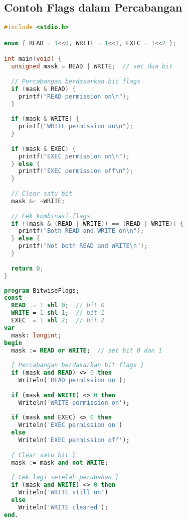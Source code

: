 \documentclass[../main.tex]{subfiles}
\begin{document}
\subsection{Contoh Flags dalam Percabangan}
\begin{lstlisting}[language=C, caption={Bit flags dengan kondisi di C}]
#include <stdio.h>

enum { READ = 1<<0, WRITE = 1<<1, EXEC = 1<<2 };

int main(void) {
  unsigned mask = READ | WRITE;  // set dua bit
  
  // Percabangan berdasarkan bit flags
  if (mask & READ) {
    printf("READ permission on\n");
  }
  
  if (mask & WRITE) {
    printf("WRITE permission on\n");
  }
  
  if (mask & EXEC) {
    printf("EXEC permission on\n");
  } else {
    printf("EXEC permission off\n");
  }
  
  // Clear satu bit
  mask &= ~WRITE;
  
  // Cek kombinasi flags
  if ((mask & (READ | WRITE)) == (READ | WRITE)) {
    printf("Both READ and WRITE on\n");
  } else {
    printf("Not both READ and WRITE\n");
  }
  
  return 0;
}
\end{lstlisting}

\begin{lstlisting}[language=Pascal, caption={Pergeseran dan bitwise dengan kondisi di Pascal}]
program BitwiseFlags;
const
  READ  = 1 shl 0;  // bit 0
  WRITE = 1 shl 1;  // bit 1
  EXEC  = 1 shl 2;  // bit 2
var
  mask: longint;
begin
  mask := READ or WRITE;  // set bit 0 dan 1
  
  { Percabangan berdasarkan bit flags }
  if (mask and READ) <> 0 then
    Writeln('READ permission on');
  
  if (mask and WRITE) <> 0 then
    Writeln('WRITE permission on');
  
  if (mask and EXEC) <> 0 then
    Writeln('EXEC permission on')
  else
    Writeln('EXEC permission off');
  
  { Clear satu bit }
  mask := mask and not WRITE;
  
  { Cek lagi setelah perubahan }
  if (mask and WRITE) <> 0 then
    Writeln('WRITE still on')
  else
    Writeln('WRITE cleared');
end.
\end{lstlisting}
\end{document}
